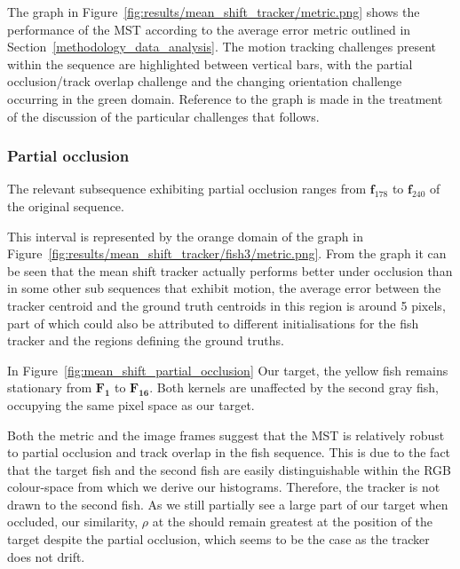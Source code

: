 The graph in Figure~\ref{fig:results/mean_shift_tracker/metric.png} shows the
performance of the MST according to the average error metric outlined in
Section~\ref{methodology_data_analysis}. 
The motion tracking challenges present within the sequence are highlighted
between vertical bars, with the partial occlusion/track overlap challenge and the changing orientation challenge occurring in the green domain.
Reference to the graph is made in the treatment of the discussion of the
particular challenges that follows.


\subsubsection{Partial occlusion}\label{mean_shift_partial_occlusion}
The relevant subsequence exhibiting partial occlusion ranges from
$\mathbf{f}_{178}$ to $\mathbf{f}_{240}$ of the original sequence. 

This interval is represented by the orange domain of the graph in
Figure~\ref{fig:results/mean_shift_tracker/fish3/metric.png}. From the graph it can be
seen that the mean shift tracker actually performs better under occlusion than in
some other sub sequences that exhibit motion, the average error between the
tracker centroid and the ground truth centroids in this region is around 5
pixels, part of which could also be attributed to different initialisations for
the fish tracker and the regions defining the ground truths.

In Figure~\ref{fig:mean_shift_partial_occlusion} Our target, the yellow fish
remains stationary from $\mathbf{F_{1}}$ to $\mathbf{F_{16}}$. Both kernels are
unaffected by the second gray fish, occupying the same pixel space as our
target. 

Both the metric and the image frames suggest that the MST is relatively robust
to partial occlusion and track overlap in the fish sequence. This is due to the fact that the target
fish and the second fish are easily distinguishable within the RGB colour-space
from which we derive our histograms. Therefore, the tracker is not drawn to the
second fish. As we still partially see a large part of our target when
occluded, our similarity, $\rho$ at the should remain greatest at the position
of the target despite the partial occlusion, which seems to be the case as the
tracker does not drift.

